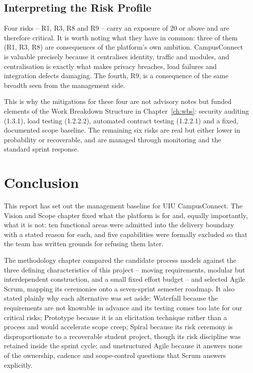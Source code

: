 \documentclass[11pt,a4paper]{report}
\begin{document}
\section{Interpreting the Risk Profile}

Four risks -- R1, R3, R8 and R9 -- carry an exposure of 20 or above and are
therefore critical. It is worth noting what they have in common: three of them
(R1, R3, R8) are consequences of the platform's own ambition. CampusConnect is
valuable precisely because it centralises identity, traffic and modules, and
centralisation is exactly what makes privacy breaches, load failures and
integration defects damaging. The fourth, R9, is a consequence of the same
breadth seen from the management side.

This is why the mitigations for these four are not advisory notes but funded
elements of the Work Breakdown Structure in Chapter~\ref{ch:wbs}: security
auditing (1.3.1), load testing (1.2.2.2), automated contract testing (1.2.2.1)
and a fixed, documented scope baseline. The remaining six risks are real but
either lower in probability or recoverable, and are managed through monitoring
and the standard sprint response.
\chapter{Conclusion}

This report has set out the management baseline for UIU CampusConnect. The Vision
and Scope chapter fixed what the platform is for and, equally importantly, what
it is not: ten functional areas were admitted into the delivery boundary with a
stated reason for each, and five capabilities were formally excluded so that the
team has written grounds for refusing them later.

The methodology chapter compared the candidate process models against the three
defining characteristics of this project -- moving requirements, modular but
interdependent construction, and a small fixed effort budget -- and selected Agile
Scrum, mapping its ceremonies onto a seven-sprint semester roadmap. It also stated
plainly why each alternative was set aside: Waterfall because the requirements are
not knowable in advance and its testing comes too late for our critical risks;
Prototype because it is an elicitation technique rather than a process and would
accelerate scope creep; Spiral because its risk ceremony is disproportionate to a
recoverable student project, though its risk discipline was retained inside the
sprint cycle; and unstructured Agile because it answers none of the ownership,
cadence and scope-control questions that Scrum answers explicitly.
\end{document}
